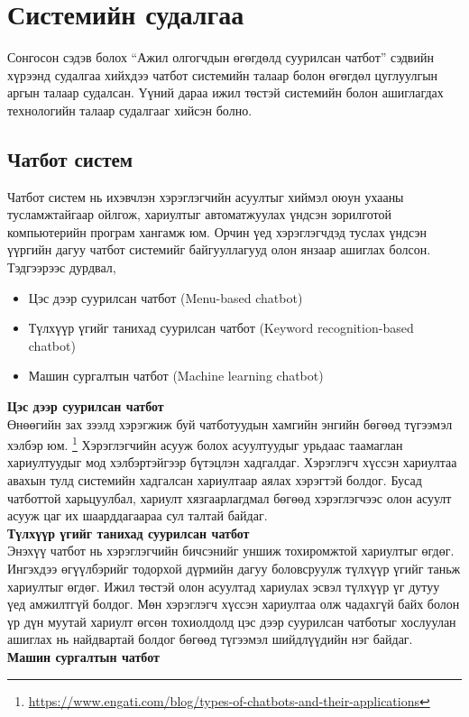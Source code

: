 \section{Системийн судалгаа}
Сонгосон сэдэв болох ``Ажил олгогчдын өгөгдөлд суурилсан чатбот'' сэдвийн хүрээнд судалгаа хийхдээ чатбот системийн талаар болон өгөгдөл цуглуулгын аргын талаар судалсан. Үүний дараа ижил төстэй системийн болон ашиглагдах технологийн талаар судалгааг хийсэн болно.
\subsection{Чатбот систем}
Чатбот систем нь ихэвчлэн хэрэглэгчийн асуултыг хиймэл оюун ухааны тусламжтайгаар ойлгож, хариултыг автоматжуулах үндсэн зорилготой компьютерийн програм хангамж юм. Орчин үед хэрэглэгчдэд туслах үндсэн үүргийн дагуу чатбот системийг байгууллагууд олон янзаар ашиглах болсон. Тэдгээрээс дурдвал,
\begin{itemize}
  \item Цэс дээр суурилсан чатбот (Menu-based chatbot)
  \item Түлхүүр үгийг танихад суурилсан чатбот (Keyword recognition-based chatbot)
  \item Машин сургалтын чатбот (Machine learning chatbot)
\end{itemize}
\textbf{Цэс дээр суурилсан чатбот}
\\Өнөөгийн зах зээлд хэрэгжиж буй чатботуудын хамгийн энгийн бөгөөд түгээмэл хэлбэр юм.\cite{chatbotsystem} \footnote{\url{https://www.engati.com/blog/types-of-chatbots-and-their-applications}} Хэрэглэгчийн асууж болох асуултуудыг урьдаас таамаглан хариултуудыг мод хэлбэртэйгээр бүтэцлэн хадгалдаг. Хэрэглэгч хүссэн хариултаа авахын тулд системийн хадгалсан хариултаар аялах хэрэгтэй болдог. Бусад чатботтой харьцуулбал, хариулт хязгаарлагдмал бөгөөд хэрэглэгчээс олон асуулт асууж цаг их шаарддагаараа сул талтай байдаг. 
\\
\textbf{Түлхүүр үгийг танихад суурилсан чатбот}
\\Энэхүү чатбот нь хэрэглэгчийн бичсэнийг уншиж тохиромжтой хариултыг өгдөг. Ингэхдээ өгүүлбэрийг тодорхой дүрмийн дагуу боловсруулж түлхүүр үгийг таньж хариултыг өгдөг. Ижил төстэй олон асуултад хариулах эсвэл түлхүүр үг дутуу үед амжилтгүй болдог. Мөн хэрэглэгч хүссэн хариултаа олж чадахгүй байх болон үр дүн муутай хариулт өгсөн тохиолдолд цэс дээр суурилсан чатботыг хослуулан ашиглах нь найдвартай болдог бөгөөд түгээмэл шийдлүүдийн нэг байдаг. 
\\
\textbf{Машин сургалтын чатбот}
